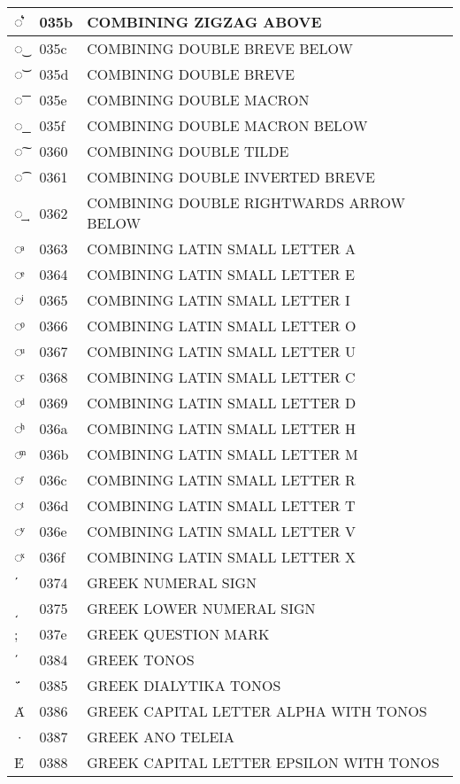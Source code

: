 \documentclass[12pt,letterpaper,openany]{book}
\begin{document}
\begin{center}
\begin{supertabular}{|m{0.25in}|m{0.5in}|m{4in}|}
			◌͛ & 035b & COMBINING ZIGZAG ABOVE\\\hline
			◌͜ & 035c & COMBINING DOUBLE BREVE BELOW\\\hline
			◌͝ & 035d & COMBINING DOUBLE BREVE\\\hline
			◌͞ & 035e & COMBINING DOUBLE MACRON\\\hline
			◌͟ & 035f & COMBINING DOUBLE MACRON BELOW\\\hline
			◌͠ & 0360 & COMBINING DOUBLE TILDE\\\hline
			◌͡ & 0361 & COMBINING DOUBLE INVERTED BREVE\\\hline
			◌͢ & 0362 & COMBINING DOUBLE RIGHTWARDS ARROW BELOW\\\hline
			◌ͣ & 0363 & COMBINING LATIN SMALL LETTER A\\\hline
			◌ͤ & 0364 & COMBINING LATIN SMALL LETTER E\\\hline
			◌ͥ & 0365 & COMBINING LATIN SMALL LETTER I\\\hline
			◌ͦ & 0366 & COMBINING LATIN SMALL LETTER O\\\hline
			◌ͧ & 0367 & COMBINING LATIN SMALL LETTER U\\\hline
			◌ͨ & 0368 & COMBINING LATIN SMALL LETTER C\\\hline
			◌ͩ & 0369 & COMBINING LATIN SMALL LETTER D\\\hline
			◌ͪ & 036a & COMBINING LATIN SMALL LETTER H\\\hline
			◌ͫ & 036b & COMBINING LATIN SMALL LETTER M\\\hline
			◌ͬ & 036c & COMBINING LATIN SMALL LETTER R\\\hline
			◌ͭ & 036d & COMBINING LATIN SMALL LETTER T\\\hline
			◌ͮ & 036e & COMBINING LATIN SMALL LETTER V\\\hline
			◌ͯ & 036f & COMBINING LATIN SMALL LETTER X\\\hline
			ʹ & 0374 & GREEK NUMERAL SIGN\\\hline
			͵ & 0375 & GREEK LOWER NUMERAL SIGN\\\hline
			; & 037e & GREEK QUESTION MARK\\\hline
			΄ & 0384 & GREEK TONOS\\\hline
			΅ & 0385 & GREEK DIALYTIKA TONOS\\\hline
			Ά & 0386 & GREEK CAPITAL LETTER ALPHA WITH TONOS\\\hline
			· & 0387 & GREEK ANO TELEIA\\\hline
			Έ & 0388 & GREEK CAPITAL LETTER EPSILON WITH TONOS\\\hline

\end{supertabular}
\end{center}
\end{document}
